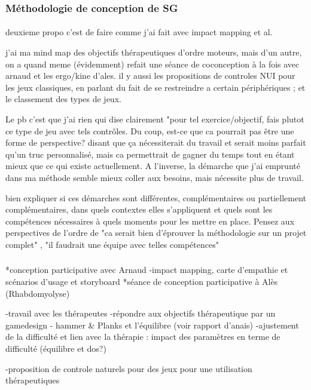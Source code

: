 	
	\subsubsection{Méthodologie de conception de SG}
	\paragraph{}
	deuxieme propo c'est de faire comme j'ai fait avec impact mapping et al.
	
	  j'ai ma mind map des objectifs thérapeutiques d'ordre moteurs, mais d'un autre, on a quand meme (évidemment) refait une séance de coconception à la fois avec arnaud et les ergo/kine d'ales. il y  aussi les propositions de controles NUI pour les jeux classiques, en parlant du fait de se restreindre a certain périphériques ; et le classement des types de jeux.
	 
 Le pb c'est que j'ai rien qui dise clairement "pour tel exercice/objectif, fais plutot ce type de jeu avec tels contrôles. Du coup, est-ce que ca pourrait pas être une forme de perspective? disant que ça nécessiterait du travail et serait moins parfait qu'un truc personnalisé, mais ca permettrait de gagner du temps tout en étant mieux que ce qui existe actuellement. A l'inverse, la démarche que j'ai emprunté dans ma méthode semble mieux coller aux besoins, mais nécessite plus de travail.
 
 bien expliquer si ces démarches sont différentes, complémentaires ou partiellement complémentaires, dans quels contextes elles s'appliquent et quels sont les compétences nécessaires à quels moments pour les mettre en place.
 Pensez aux perspectives de l'ordre de "ca serait bien d'éprouver la méthodologie sur un projet complet" , "il faudrait une équipe avec telles compétences"
		\subsubsection{}

	*conception participative avec Arnaud 
		-impact mapping, carte d'empathie et scénarios d'usage et storyboard
	*séance de conception participative à Alès (Rhabdomyolyse)
	
	-travail avec les thérapeutes
	-répondre aux objectifs thérapeutique par un gamedesign
		- hammer \& Planks et l'équilibre (voir rapport d'anais)
	-ajustement de la difficulté et lien avec la thérapie : impact des paramètres en terme de difficulté (équilibre et dos?)
	
	-proposition de controle naturels pour des jeux pour une utilisation thérapeutiques